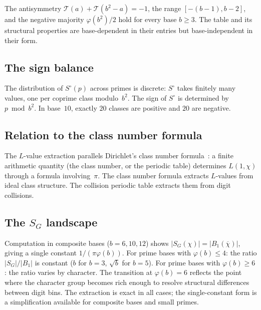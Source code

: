 \documentclass[12pt]{amsart}
\theoremstyle{definition}
\theoremstyle{remark}
\begin{document}
The antisymmetry $\mathcal{T}(a) + \mathcal{T}(b^2{-}a) = -1$,
the range $[-(b{-}1), b{-}2]$, and the negative majority
$\varphi(b^2)/2$ hold for every base $b \ge 3$. The table
and its structural properties are base-dependent in their
entries but base-independent in their form.

\subsection*{The sign balance}

The distribution of $S^{\circ}(p)$ across primes is discrete:
$S^{\circ}$ takes finitely many values, one per coprime class
modulo~$b^2$. The sign of $S^{\circ}$ is determined by
$p \bmod b^2$. In base~$10$, exactly $20$ classes are positive
and $20$ are negative.

\subsection*{Relation to the class number formula}

The $L$-value extraction parallels Dirichlet's class number
formula~\cite{davenport}: a finite arithmetic quantity (the
class number, or the periodic table) determines $L(1, \chi)$
through a formula involving~$\pi$. The class number formula
extracts $L$-values from ideal class structure. The collision
periodic table extracts them from digit collisions.

\subsection*{The $S_G$ landscape}

Computation in composite bases ($b = 6, 10, 12$) shows
$|S_G(\chi)| = |B_1(\overline{\chi})|$, giving a single
constant $1/(\pi \varphi(b))$.
For prime bases with $\varphi(b) \le 4$: the ratio
$|S_G|/|B_1|$ is constant ($b$ for $b = 3$,
$\sqrt{b}$ for $b = 5$). For prime bases with
$\varphi(b) \ge 6$: the ratio varies by character. The
transition at $\varphi(b) = 6$ reflects the point where the
character group becomes rich enough to resolve structural
differences between digit bins. The extraction is exact
in all cases; the single-constant form is a simplification
available for composite bases and small primes.
\end{document}
